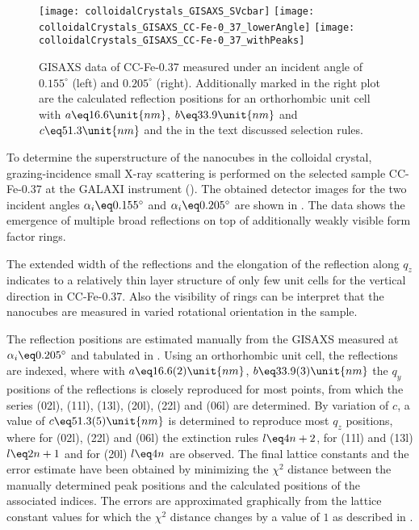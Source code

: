 \documentclass[\main/dresen_thesis.tex]{subfiles}
\begin{document}
  \label{sec:colloidalCrystals:layers:gisaxs}
  \begin{figure}[tb]
    \centering
    \texttt{[image: colloidalCrystals\_GISAXS\_SVcbar]}
    \texttt{[image: colloidalCrystals\_GISAXS\_CC-Fe-0\_37\_lowerAngle]}
    \texttt{[image: colloidalCrystals\_GISAXS\_CC-Fe-0\_37\_withPeaks]}
    \caption{\label{fig:colloidalCrystals:layers:gisaxs}GISAXS data of CC-Fe-0.37 measured under an incident angle of $0.155 ^\circ$ (left) and $0.205 ^\circ$ (right). Additionally marked in the right plot are the calculated reflection positions for an orthorhombic unit cell with $a \eq 16.6 \unit{nm}$, $b \eq 33.9 \unit{nm}$ and $c \eq 51.3 \unit{nm}$ and the in the text discussed selection rules.}
  \end{figure}

  To determine the superstructure of the nanocubes in the colloidal crystal, grazing-incidence small X-ray scattering is performed on the selected sample CC-Fe-0.37 at the GALAXI instrument ().
  The obtained detector images for the two incident angles $\alpha_i \eq 0.155^\circ$ and $\alpha_i \eq 0.205^\circ$ are shown in .
  The data shows the emergence of multiple broad reflections on top of additionally weakly visible form factor rings.

  The extended width of the reflections and the elongation of the reflection along $q_z$ indicates to a relatively thin layer structure of only few unit cells for the vertical direction in CC-Fe-0.37.
  Also the visibility of rings can be interpret that the nanocubes are measured in varied rotational orientation in the sample.

  The reflection positions are estimated manually from the GISAXS measured at $\alpha_i \eq 0.205 ^\circ$ and tabulated in .
  Using an orthorhombic unit cell, the reflections are indexed, where with $a \eq 16.6(2) \unit{nm}$, $b \eq 33.9(3) \unit{nm}$ the $q_y$ positions of the reflections is closely reproduced for most points, from which the series (02l), (11l), (13l), (20l), (22l) and (06l) are determined.
  By variation of $c$, a value of $c \eq 51.3(5) \unit{nm}$ is determined to reproduce most $q_z$ positions, where for (02l), (22l) and (06l) the extinction rules $l \eq 4n + 2$, for (11l) and (13l) $l \eq 2n + 1$ and for (20l) $l \eq 4n$ are observed.
  The final lattice constants and the error estimate have been obtained by minimizing the $\chi^2$ distance between the manually determined peak positions and the calculated positions of the associated indices.
  The errors are approximated graphically from the lattice constant values for which the $\chi^2$ distance changes by a value of $1$ as described in \cite{Bevington_2003_Datar}.
\end{document}
